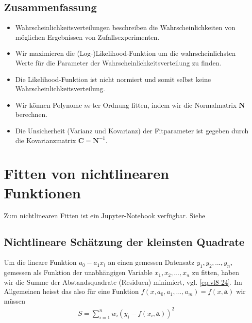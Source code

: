 \subsection{Zusammenfassung}
\label{subsec:vl8-6}

\begin{itemize}
    \setlength\itemsep{0em}
        \item Wahrscheinlichkeitsverteilungen beschreiben die Wahrscheinlichkeiten von m\"oglichen Ergebnissen von Zufallsexperimenten.
        \item Wir maximieren die (Log-)Likelihood-Funktion um die wahrscheinlichsten Werte f\"ur die Parameter der Wahrscheinlichkeitsverteilung zu finden.
        \item Die Likelihood-Funktion ist nicht normiert und somit selbst keine Wahrscheinlichkeitsverteilung.
        \item Wir k\"onnen Polynome $m$-ter Ordnung fitten, indem wir die Normalmatrix $\boldsymbol{N}$ berechnen.
        \item Die Unsicherheit (Varianz und Kovarianz) der Fitparameter ist gegeben durch die Kovarianzmatrix $\boldsymbol{C} = \boldsymbol{N}^{-1}$.
\end{itemize}

\section{Fitten von nichtlinearen Funktionen}\label{sec:nonLinearFit}
\begin{center}
\begin{tcolorbox}[enhanced,width=6in,center upper,
    fontupper=\large,drop fuzzy shadow southwest,
    colframe=blue!50!black,colback=blue!10]
    {Zum nichtlinearen Fitten ist ein Jupyter-Notebook verfügbar. Siehe  }
\end{tcolorbox}
\end{center}

\subsection{Nichtlineare Sch\"atzung der kleinsten Quadrate}
\label{subsec:vl9}

Um die lineare Funktion $a_0 - a_1 x_i$ an einen gemessen Datensatz $y_1, y_2, ..., y_n$, gemessen als Funktion der unabh\"angigen Variable $x_1, x_2, ..., x_n$ zu fitten, haben wir die Summe der Abstandsquadrate (Residuen) minimiert, vgl. \cref{eq:vl8-24}. Im Allgemeinen heisst das also f\"ur eine Funktion $f(x, a_0, a_1, ..., a_m) = f(x, \boldsymbol{a})$ wir m\"ussen
\begin{align}
S = \sum_{i=1}^n w_i (y_i - f(x_i, \boldsymbol{a}) )^2
\label{eq:vl9-1}
\end{align}

